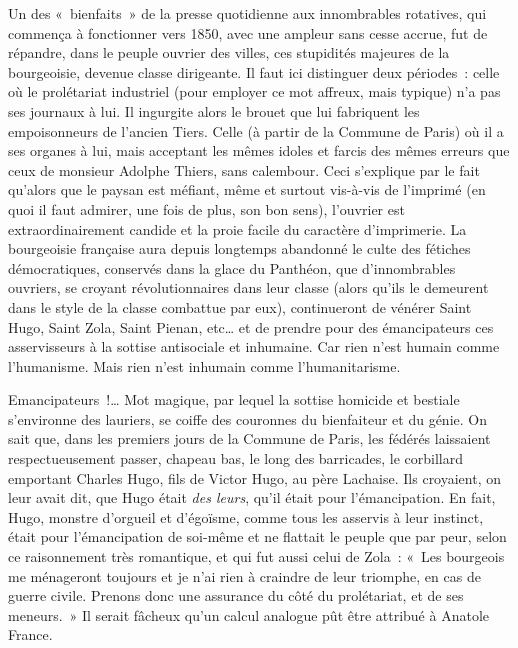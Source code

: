 \documentclass[french,twoside]{book} %
\begin{document}
Un des « bienfaits » de la presse quotidienne aux innombrables rotatives, qui commença à fonctionner vers 1850, avec une ampleur sans cesse accrue, fut de répandre, dans le peuple ouvrier des villes, ces stupidités majeures de la bourgeoisie, devenue classe dirigeante. Il faut ici distinguer deux périodes : celle où le prolétariat industriel (pour employer ce mot affreux, mais typique) n’a pas ses journaux à lui. Il ingurgite alors le brouet que lui fabriquent les empoisonneurs de l’ancien Tiers. Celle (à partir de la Commune de Paris) où il a ses organes à lui, mais acceptant les mêmes idoles et farcis des mêmes erreurs que ceux de monsieur Adolphe Thiers, sans calembour. Ceci s’explique par le fait qu’alors que le paysan est méfiant, même et surtout vis-à-vis de l’imprimé (en quoi il faut admirer, une fois de plus, son bon sens), l’ouvrier est extraordinairement candide et la proie facile du caractère d’imprimerie. La bourgeoisie française aura depuis longtemps abandonné le culte des fétiches démocratiques, conservés dans la glace du Panthéon, que d’innombrables ouvriers, se croyant révolutionnaires dans leur classe (alors qu’ils le demeurent dans le style de la classe combattue par eux), continueront de vénérer Saint Hugo, Saint Zola, Saint Pienan, etc… et de prendre pour des émancipateurs ces asservisseurs à la sottise antisociale et inhumaine. Car rien n’est humain comme l’humanisme. Mais rien n’est inhumain comme l’humanitarisme.\par
Emancipateurs !… Mot magique, par lequel la sottise homicide et bestiale s’environne des lauriers, se coiffe des couronnes du bienfaiteur et du génie. On sait que, dans les premiers jours de la Commune de Paris, les fédérés laissaient respectueusement passer, chapeau bas, le long des barricades, le corbillard emportant Charles Hugo, fils de Victor Hugo, au père Lachaise. Ils croyaient, on leur avait dit, que Hugo était {\itshape des leurs}, qu’il était pour l’émancipation. En fait, Hugo, monstre d’orgueil et d’égoïsme, comme tous les asservis à leur instinct, était pour l’émancipation de soi-même et ne flattait le peuple que par peur, selon ce raisonnement très romantique, et qui fut aussi celui de Zola : « Les bourgeois me ménageront toujours et je n’ai rien à craindre de leur triomphe, en cas de guerre civile. Prenons donc une assurance du côté du prolétariat, et de ses meneurs. » Il serait fâcheux qu’un calcul analogue pût être attribué à Anatole France.\par
\end{document}
